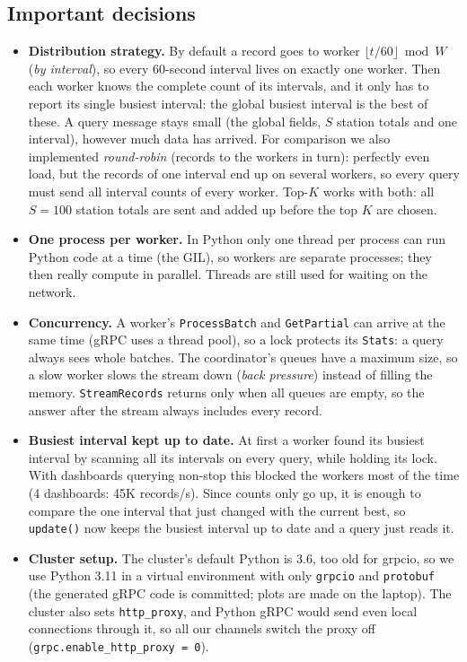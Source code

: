 \documentclass[10pt,a4paper]{article}
\newcommand{\code}[1]{\texttt{#1}}
\begin{document}
\subsection{Important decisions}
\begin{itemize}
\item \textbf{Distribution strategy.} By default a record goes to worker $\lfloor t/60\rfloor \bmod W$ (\emph{by interval}), so every
60-second interval lives on exactly one worker. Then each worker knows the complete count of its intervals, and it only has to
report its single busiest interval: the global busiest interval is the best of these. A query message stays small (the global
fields, $S$ station totals and one interval), however much data has arrived. For comparison we also implemented
\emph{round-robin} (records to the workers in turn): perfectly even load, but the records of one interval end up on several
workers, so every query must send all interval counts of every worker. Top-$K$ works with both: all $S=100$ station totals
are sent and added up before the top $K$ are chosen.
\item \textbf{One process per worker.} In Python only one thread per process can run Python code at a time (the GIL), so
workers are separate processes; they then really compute in parallel. Threads are still used for waiting on the network.
\item \textbf{Concurrency.} A worker's \code{ProcessBatch} and \code{GetPartial} can arrive at the same time (gRPC uses a thread
pool), so a lock protects its \code{Stats}: a query always sees whole batches. The coordinator's queues have a maximum size, so a
slow worker slows the stream down (\emph{back pressure}) instead of filling the memory. \code{StreamRecords} returns only when all
queues are empty, so the answer after the stream always includes every record.
\item \textbf{Busiest interval kept up to date.} At first a worker found its busiest interval by scanning all its intervals on every
query, while holding its lock. With dashboards querying non-stop this blocked the workers most of the time (4 dashboards: 45K
records/s). Since counts only go up, it is enough to compare the one interval that just changed with the current best, so
\code{update()} now keeps the busiest interval up to date and a query just reads it.
\item \textbf{Cluster setup.} The cluster's default Python is 3.6, too old for grpcio, so we use Python 3.11 in a virtual
environment with only \code{grpcio} and \code{protobuf} (the generated gRPC code is committed; plots are made on the laptop).
The cluster also sets \code{http\_proxy}, and Python gRPC would send even local connections through it, so all our channels
switch the proxy off (\code{grpc.enable\_http\_proxy = 0}).
\end{itemize}
\end{document}
